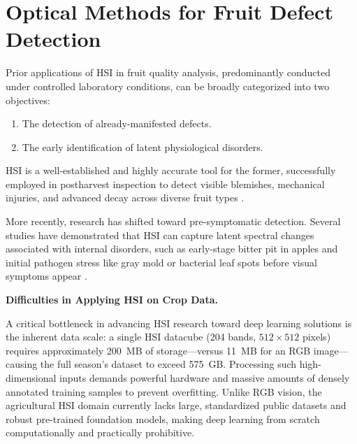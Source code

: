 \section{Optical Methods for Fruit Defect Detection}
\label{sec:related_work}

\medskip
\noindent
Prior applications of HSI in fruit quality analysis, predominantly conducted under controlled laboratory conditions, can be broadly categorized into two objectives:
\begin{enumerate}
    \item The detection of already-manifested defects.
    \item The early identification of latent physiological disorders.
\end{enumerate}
HSI is a well-established and highly accurate tool for the former, successfully employed in postharvest inspection to detect visible blemishes, mechanical injuries, and advanced decay across diverse fruit types \parencite{app13053279, agriculture15202167, min2023decay, app13179740}. 

\medskip
\noindent
More recently, research has shifted toward pre-symptomatic detection. Several studies have demonstrated that HSI can capture latent spectral changes associated with internal disorders, such as early-stage bitter pit in apples \parencite{DONG2025101166} and initial pathogen stress like gray mold or bacterial leaf spots before visual symptoms appear \parencite{haghbin2023non, zhang2024early, zhang2024hyperspectral, ou2024hyperspectral}. 


\medskip
\noindent
\textbf{Difficulties in Applying HSI on Crop Data.}

\medskip
\noindent
A critical bottleneck in advancing HSI research toward deep learning solutions is the inherent data scale: a single HSI datacube (204 bands, $512 \times 512$ pixels) requires approximately 200~MB of storage---versus 11~MB for an RGB image---causing the full season's dataset to exceed 575~GB. Processing such high-dimensional inputs demands powerful hardware and massive amounts of densely annotated training samples to prevent overfitting. Unlike RGB vision, the agricultural HSI domain currently lacks large, standardized public datasets and robust pre-trained foundation models, making deep learning from scratch computationally and practically prohibitive.

